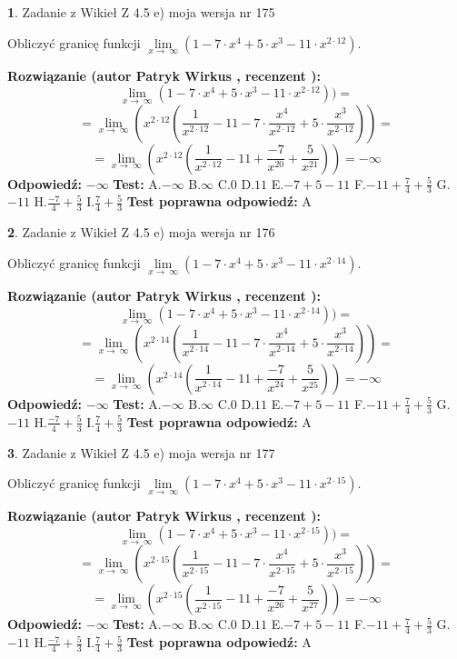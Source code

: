 \documentclass[12pt, a4paper]{article}
\theoremstyle{definition} %
\newtheorem{zad}{}
\newcommand{\zadStart}[1]{\begin{zad}#1\newline}
\newcommand{\zadStop}{\end{zad}}
\newcommand{\rozwStart}[2]{\noindent \textbf{Rozwiązanie (autor #1 , recenzent #2): }\newline}
\newcommand{\rozwStop}{\newline}
\newcommand{\odpStart}{\noindent \textbf{Odpowiedź:}\newline}
\newcommand{\odpStop}{\newline}
\newcommand{\testStart}{\noindent \textbf{Test:}\newline}
\newcommand{\testStop}{\newline}
\newcommand{\kluczStart}{\noindent \textbf{Test poprawna odpowiedź:}\newline}
\newcommand{\kluczStop}{\newline}
\begin{document}
\zadStart{Zadanie z Wikieł Z 4.5 e) moja wersja nr 175}



Obliczyć granicę funkcji  $\lim\limits_{x\to\ \infty}(1 - 7 \cdot x^{4}+5 \cdot x^{3}- 11 \cdot x^{2\cdot12})$.
\zadStop
\rozwStart{Patryk Wirkus}{}
$$\lim\limits_{x\to\ \infty}(1 - 7 \cdot x^{4}+5 \cdot x^{3}- 11 \cdot x^{2\cdot12}))=$$
$$=\lim\limits_{x\to\ \infty}(x^{2\cdot12}(\frac{1}{x^{2\cdot12}}-11 -7 \cdot \frac{x^{4}}{x^{2\cdot12}}+5 \cdot \frac{x^{3}}{x^{2\cdot12}}))=$$
$$=\lim\limits_{x\to\ \infty}(x^{2\cdot12}(\frac{1}{x^{2\cdot12}}-11 + \frac{-7}{x^{20}}+ \frac{5}{x^{21}}))=-\infty$$
\rozwStop
\odpStart
$-\infty$
\odpStop
\testStart
A.$-\infty$ B.$\infty$ C.$0$ D.$11$ E.$-7 + 5 - 11$
F.$-11+\frac{7}{4}+\frac{5}{3}$ G.$-11$
H.$\frac{-7}{4}+\frac{5}{3}$
I.$\frac{7}{4}+\frac{5}{3}$
\testStop
\kluczStart
A
\kluczStop



\zadStart{Zadanie z Wikieł Z 4.5 e) moja wersja nr 176}



Obliczyć granicę funkcji  $\lim\limits_{x\to\ \infty}(1 - 7 \cdot x^{4}+5 \cdot x^{3}- 11 \cdot x^{2\cdot14})$.
\zadStop
\rozwStart{Patryk Wirkus}{}
$$\lim\limits_{x\to\ \infty}(1 - 7 \cdot x^{4}+5 \cdot x^{3}- 11 \cdot x^{2\cdot14}))=$$
$$=\lim\limits_{x\to\ \infty}(x^{2\cdot14}(\frac{1}{x^{2\cdot14}}-11 -7 \cdot \frac{x^{4}}{x^{2\cdot14}}+5 \cdot \frac{x^{3}}{x^{2\cdot14}}))=$$
$$=\lim\limits_{x\to\ \infty}(x^{2\cdot14}(\frac{1}{x^{2\cdot14}}-11 + \frac{-7}{x^{24}}+ \frac{5}{x^{25}}))=-\infty$$
\rozwStop
\odpStart
$-\infty$
\odpStop
\testStart
A.$-\infty$ B.$\infty$ C.$0$ D.$11$ E.$-7 + 5 - 11$
F.$-11+\frac{7}{4}+\frac{5}{3}$ G.$-11$
H.$\frac{-7}{4}+\frac{5}{3}$
I.$\frac{7}{4}+\frac{5}{3}$
\testStop
\kluczStart
A
\kluczStop



\zadStart{Zadanie z Wikieł Z 4.5 e) moja wersja nr 177}



Obliczyć granicę funkcji  $\lim\limits_{x\to\ \infty}(1 - 7 \cdot x^{4}+5 \cdot x^{3}- 11 \cdot x^{2\cdot15})$.
\zadStop
\rozwStart{Patryk Wirkus}{}
$$\lim\limits_{x\to\ \infty}(1 - 7 \cdot x^{4}+5 \cdot x^{3}- 11 \cdot x^{2\cdot15}))=$$
$$=\lim\limits_{x\to\ \infty}(x^{2\cdot15}(\frac{1}{x^{2\cdot15}}-11 -7 \cdot \frac{x^{4}}{x^{2\cdot15}}+5 \cdot \frac{x^{3}}{x^{2\cdot15}}))=$$
$$=\lim\limits_{x\to\ \infty}(x^{2\cdot15}(\frac{1}{x^{2\cdot15}}-11 + \frac{-7}{x^{26}}+ \frac{5}{x^{27}}))=-\infty$$
\rozwStop
\odpStart
$-\infty$
\odpStop
\testStart
A.$-\infty$ B.$\infty$ C.$0$ D.$11$ E.$-7 + 5 - 11$
F.$-11+\frac{7}{4}+\frac{5}{3}$ G.$-11$
H.$\frac{-7}{4}+\frac{5}{3}$
I.$\frac{7}{4}+\frac{5}{3}$
\testStop
\kluczStart
A
\kluczStop
\end{document}

